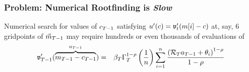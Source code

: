 \documentclass{beamer}
\begin{document}
\begin{frame}[label=vEndtSlow]
\frametitle{Problem: Numerical Rootfinding is {\it Slow}}

Numerical search for values of $c_{T-1}$ satisfying
$u^{\prime}(c) = \mathfrak{v}^{\prime}_{t}(m[i]-c)$ at, say,
6 gridpoints of $\vec{m}_{T-1}$ may require hundreds or even thousands of
evaluations of
\begin{eqnarray}
        \mathfrak{v}^{\prime}_{T-1}(\overbrace{{m}_{T-1}-{c}_{T-1}}^{a_{T-1}}) & = &   \beta_{T} \Gamma_{T}^{1-\rho}\left(\frac{1}{n}\right)\sum_{i=1}^{n}   \frac{\left( \mathcal{R}_{T} {a}_{T-1} + \theta_{i}\right)^{1-\rho}}{1-\rho} \notag
\end{eqnarray}

\end{frame}
\end{document}
